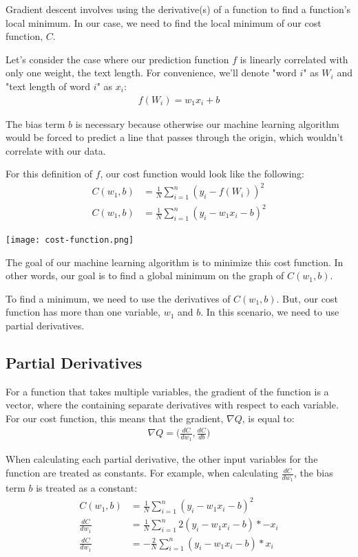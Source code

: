 \documentclass[12pt, demo]{article}
\begin{document}
Gradient descent involves using the derivative(s) of a function to find a function's local minimum. In our case, we need to find the local minimum of our cost function, $C$.

Let's consider the case where our prediction function $f$ is linearly correlated with only one weight, the text length. For convenience, we'll denote "word $i$" as $W_i$ and "text length of word $i$" as $x_i$:
\begin{align}
	f(W_i) = w_1x_i + b
\end{align}

The bias term $b$ is necessary because otherwise our machine learning algorithm would be forced to predict a line that passes through the origin, which wouldn't correlate with our data.

For this definition of $f$, our cost function would look like the following:
\begin{align}
	C(w_1, b) & = \frac{1}{N} \sum_{i=1}^{n} (y_i - f(W_i))^2
	\\
	C(w_1, b) & = \frac{1}{N} \sum_{i=1}^{n} (y_i - w_1x_i - b)^2
\end{align}

\texttt{[image: cost-function.png]}

The goal of our machine learning algorithm is to minimize this cost function. In other words, our goal is to find a global minimum on the graph of $C(w_1, b)$.

To find a minimum, we need to use the derivatives of $C(w_1, b)$. But, our cost function has more than one variable, $w_1$ and $b$. In this scenario, we need to use partial derivatives.

\subsection*{Partial Derivatives}

For a function that takes multiple variables, the gradient of the function is a vector, where the  containing separate derivatives with respect to each variable. For our cost function, this means that the gradient, $\nabla Q$, is equal to:
\begin{align*}
	\nabla Q = \Big(\frac{dC}{dw_1}, \frac{dC}{db}\Big)
\end{align*}

When calculating each partial derivative, the other input variables for the function are treated as constants. For example, when calculating $\frac{dC}{dw_1}$, the bias term $b$ is treated as a constant:
\begin{align*}
	C(w_1, b)       & = \frac{1}{N} \sum_{i=1}^{n} (y_i - w_1x_i - b)^2
	\\
	\frac{dC}{dw_1} & = \frac{1}{N} \sum_{i=1}^{n} 2(y_i - w_1x_i - b) * -x_i
	\\
	\frac{dC}{dw_1} & = -\frac{2}{N} \sum_{i=1}^{n} (y_i - w_1x_i - b) * x_i
\end{align*}
\end{document}
